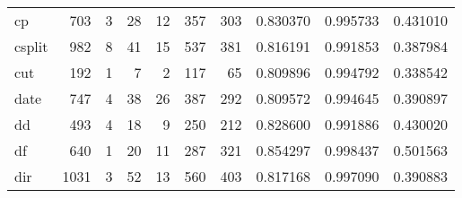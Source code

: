 \begin{longtable}{lrrrrrrrrr}
cp        &                    703 &                                  3 &                                28 &                               12 &                               357 &                             303 &                                0.830370 &                               0.995733 &                             0.431010 \\
csplit    &                    982 &                                  8 &                                41 &                               15 &                               537 &                             381 &                                0.816191 &                               0.991853 &                             0.387984 \\
cut       &                    192 &                                  1 &                                 7 &                                2 &                               117 &                              65 &                                0.809896 &                               0.994792 &                             0.338542 \\
date      &                    747 &                                  4 &                                38 &                               26 &                               387 &                             292 &                                0.809572 &                               0.994645 &                             0.390897 \\
dd        &                    493 &                                  4 &                                18 &                                9 &                               250 &                             212 &                                0.828600 &                               0.991886 &                             0.430020 \\
df        &                    640 &                                  1 &                                20 &                               11 &                               287 &                             321 &                                0.854297 &                               0.998437 &                             0.501563 \\
dir       &                   1031 &                                  3 &                                52 &                               13 &                               560 &                             403 &                                0.817168 &                               0.997090 &                             0.390883 \\

\end{longtable}
